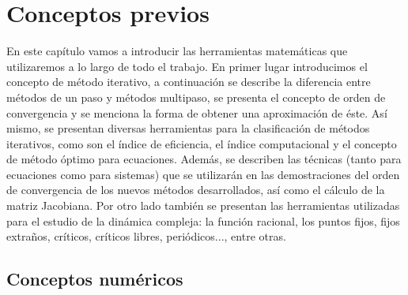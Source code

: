
\chapter{Conceptos previos}\label{capituloconceptosprevios}

En este capítulo vamos a introducir las herramientas matemáticas que utilizaremos a lo largo de todo el trabajo. En primer lugar introducimos el concepto de método iterativo, a continuación se describe la diferencia entre métodos de un paso y métodos multipaso, se presenta el concepto de orden de convergencia y se menciona la forma de obtener una aproximación de éste. Así mismo, se presentan diversas herramientas para la clasificación de métodos iterativos, como son el índice de eficiencia, el índice computacional y el concepto de método óptimo para ecuaciones. Además, se describen las técnicas (tanto para ecuaciones como para sistemas) que se utilizarán en las demostraciones del orden de convergencia de los nuevos métodos desarrollados, así como el cálculo de la matriz Jacobiana. Por otro lado también se presentan las herramientas utilizadas para el estudio de la dinámica compleja: la función racional, los puntos fijos, fijos extraños, críticos, críticos libres, periódicos..., entre otras.

\section{Conceptos numéricos}

